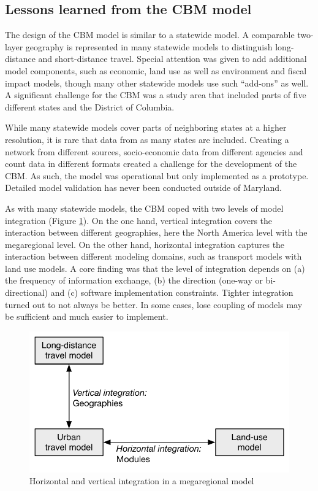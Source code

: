 \subsection{Lessons learned from the CBM model}

The design of the CBM model is similar to a statewide model. A comparable two-layer geography is represented in many statewide models to distinguish long-distance and short-distance travel. Special attention was given to add additional model components, such as economic, land use as well as environment and fiscal impact models, though many other statewide models use such ``add-ons'' as well. A significant challenge for the CBM was a study area that included parts of five different states and the District of Columbia.

While many statewide models cover parts of neighboring states at a higher resolution, it is rare that data from as many states are included. Creating a network from different sources, socio-economic data from different agencies and count data in different formats created a challenge for the development of the CBM. As such, the model was operational but only implemented as a prototype. Detailed model validation has never been conducted outside of Maryland.

As with many statewide models, the CBM coped with two levels of model integration (Figure \ref{fig:horizontal-vertical-integration}). On the one hand, vertical integration covers the interaction between different geographies, here the North America level with the megaregional level. On the other hand, horizontal integration captures the interaction between different modeling domains, such as transport models with land use models. A core finding was that the level of integration depends on (a) the frequency of information exchange, (b) the direction (one-way or bi-directional) and (c) software implementation constraints. Tighter integration turned out to not always be better. In some cases, lose coupling of models may be sufficient and much easier to implement.

\begin{figure}
\centering
\includegraphics[scale=0.6]{graphics/51-horizontal-vertical-integration}
\caption{Horizontal and vertical integration in a megaregional model}
\label{fig:horizontal-vertical-integration}
\end{figure}

